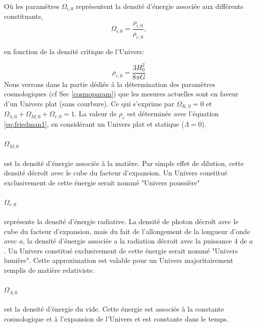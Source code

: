 Où les paramètres $\Omega_{i,0}$ représentent la densité d'énergie associée aux différents constituants, 
\begin{equation}
 \Omega_{i,0} = \frac{\rho_{i,0}}{\rho_{c,0}},
 \end{equation}

en fonction de la densité critique de l'Univers:

\begin{equation}
\rho_{c,0} = \frac{3H_0^2}{8\pi G}
 \end{equation}
Nous verrons dans la partie dédiée à la détermination des paramètres cosmologiques (cf Sec \ref{cosmoparam}) que les mesures actuelles sont en faveur d'un Univers plat (sans courbure).
Ce qui s'exprime par $\Omega_{K,0} = 0$ et $\Omega_{\lambda,0} +  \Omega_{M,0} + \Omega_{r,0} =1$.
La valeur de $\rho_c$ est déterminée avec l'équation \ref{eq:friedman1}, en considérant un Univers plat et statique ($\Lambda=0$).

\paragraph{$\Omega_{M,0}$} est la densité d'énergie associée à la matière. %
Par simple effet de dilution, cette densité décroît avec le cube du facteur d'expansion.
Un Univers constitué exclusivement de cette énergie serait nommé "Univers poussière"

\paragraph{$\Omega_{r,0}$} représente la densité d'énergie radiative.
La densité de photon décroît avec le cube du facteur d'expansion, mais du fait de l'allongement de la longueur d'onde avec $a$, la densité d'énergie associée a la radiation décroit avec la puissance $4$ de $a$.
Un Univers constitué exclusivement de cette énergie serait nommé "Univers lumière".
Cette approximation est valable pour un Univers majoritairement remplis de matière relativiste.

\paragraph{$\Omega_{\Lambda,0}$} est la densité d’énergie du vide.
Cette énergie est associée à la constante cosmologique et à l'expansion de l'Univers et est constante dans le temps.

